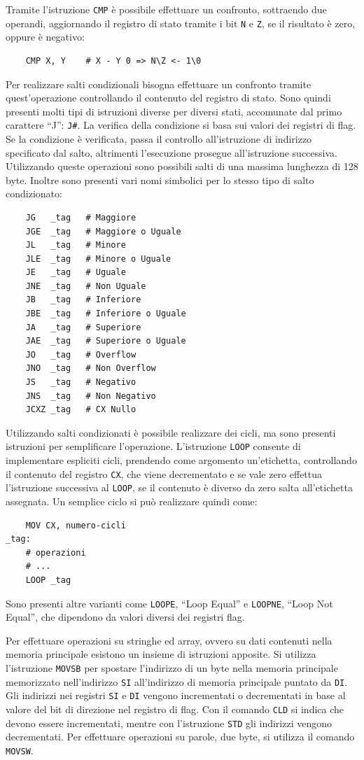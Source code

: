 \documentclass{article}
\numberwithin{equation}{subsection}
\begin{document}
Tramite l'istruzione \verb|CMP| è possibile effettuare un confronto, sottraendo due operandi, aggiornando il registro di stato tramite i bit \verb|N| e \verb|Z|, se il 
risultato è zero, oppure è negativo:
\begin{verbatim}
    CMP X, Y    # X - Y 0 => N\Z <- 1\0
\end{verbatim}
Per realizzare salti condizionali bisogna effettuare un confronto tramite quest'operazione controllando il contenuto del registro di stato. Sono 
quindi presenti molti tipi di istruzioni diverse per diversi stati, accomunate dal primo carattere ``J'': \verb|J#|. La verifica della condizione si basa sui valori dei registri di flag. 
Se la condizione è verificata, passa il controllo all'istruzione di indirizzo specificato dal salto, altrimenti l'esecuzione prosegue all'istruzione successiva. 
Utilizzando queste operazioni sono possibili salti di una massima lunghezza di 128 byte. Inoltre sono presenti vari nomi simbolici per lo stesso tipo di salto condizionato:
\begin{verbatim}
    JG   _tag   # Maggiore 
    JGE  _tag   # Maggiore o Uguale
    JL   _tag   # Minore
    JLE  _tag   # Minore o Uguale
    JE   _tag   # Uguale
    JNE  _tag   # Non Uguale
    JB   _tag   # Inferiore
    JBE  _tag   # Inferiore o Uguale
    JA   _tag   # Superiore
    JAE  _tag   # Superiore o Uguale
    JO   _tag   # Overflow
    JNO  _tag   # Non Overflow
    JS   _tag   # Negativo
    JNS  _tag   # Non Negativo
    JCXZ _tag   # CX Nullo
\end{verbatim}

Utilizzando salti condizionati è possibile realizzare dei cicli, ma sono presenti istruzioni per semplificare l'operazione. L'istruzione \verb|LOOP| 
consente di implementare espliciti cicli, prendendo come argomento un'etichetta, controllando il contenuto del registro \verb|CX|, che viene decrementato e 
se vale zero effettua l'istruzione successiva al \verb|LOOP|, se il contenuto è diverso da zero salta all'etichetta assegnata. Un semplice ciclo si può realizzare quindi come:
\begin{verbatim}
    MOV CX, numero-cicli
_tag:  
    # operazioni 
    # ...
    LOOP _tag
\end{verbatim}
Sono presenti altre varianti come \verb|LOOPE|, ``Loop Equal'' e \verb|LOOPNE|, ``Loop Not Equal'', che dipendono da valori diversi dei registri flag. 


Per effettuare operazioni su stringhe ed array, ovvero su dati contenuti nella memoria principale esistono un insieme di istruzioni apposite. Si 
utilizza l'istruzione \verb|MOVSB| per spostare l'indirizzo di un byte nella memoria principale memorizzato nell'indirizzo \verb|SI| all'indirizzo 
di memoria principale puntato da \verb|DI|. Gli indirizzi nei registri \verb|SI| e \verb|DI| vengono incrementati o decrementati in base al valore del 
bit di direzione nel registro di flag. Con il comando \verb|CLD| si indica che devono essere incrementati, mentre con l'istruzione \verb|STD| gli 
indirizzi vengono decrementati. Per effettuare operazioni su parole, due byte, si utilizza il comando \verb|MOVSW|. 
\end{document}
